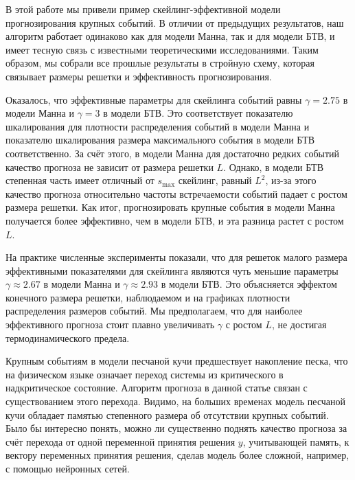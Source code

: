В этой работе мы привели пример скейлинг-эффективной модели прогнозирования крупных событий. В отличии от предыдущих результатов, наш алгоритм работает одинаково как для модели Манна, так и для модели БТВ, и имеет тесную связь с известными теоретическими исследованиями. Таким образом, мы собрали все прошлые результаты в стройную схему, которая связывает размеры решетки и эффективность прогнозирования. 

Оказалось, что эффективные параметры для скейлинга событий равны $\gamma=2.75$ в модели Манна и $\gamma=3$ в модели БТВ. Это соответствует показателю шкалирования для плотности распределения событий в модели Манна и показателю шкалирования размера максимального события в модели БТВ соответственно. За счёт этого, в модели Манна для достаточно редких событий качество прогноза не зависит от размера решетки $L$. Однако, в модели БТВ степенная часть имеет отличный от $s_{\max}$ скейлинг, равный $L^2$, из-за этого качество прогноза относительно частоты встречаемости событий падает с ростом размера решетки. Как итог, прогнозировать крупные события в модели Манна получается более эффективно, чем в модели БТВ, и эта разница растет с ростом $L$.

На практике численные эксперименты показали, что для решеток малого размера эффективными показателями для скейлинга являются чуть меньшие параметры $\gamma \approx 2.67$ в модели Манна и $\gamma \approx 2.93$ в модели БТВ. Это объясняется эффектом конечного размера решетки, наблюдаемом и на графиках плотности распределения размеров событий. Мы предполагаем, что для наиболее эффективного прогноза стоит плавно увеличивать $\gamma$ с ростом $L$, не достигая термодинамического предела.

Крупным событиям в модели песчаной кучи предшествует накопление песка, что на физическом языке означает переход системы из критического в надкритическое состояние. Алгоритм прогноза в данной статье связан с существованием этого перехода. Видимо, на больших временах модель песчаной кучи обладает памятью степенного размера об отсутствии крупных событий. Было бы интересно понять, можно ли существенно поднять качество прогноза за счёт перехода от одной переменной принятия решения $y$, учитывающей память, к вектору переменных принятия решения, сделав модель более сложной, например, с помощью нейронных сетей.

